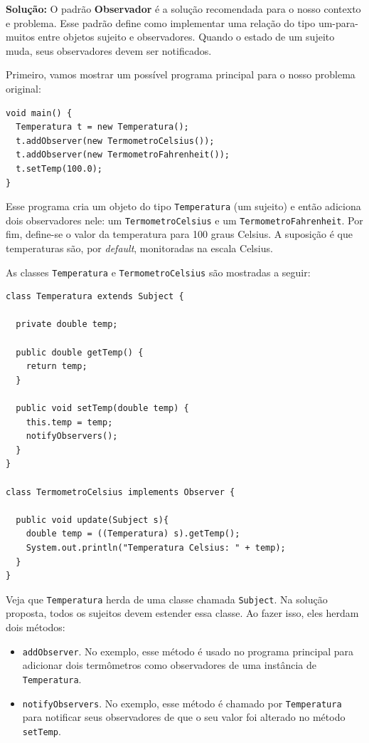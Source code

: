 \documentclass[
  11pt,
  twoside]{book}
\newcommand{\passthrough}[1]{#1}
\begin{document}
\textbf{Solução:} O padrão \textbf{Observador} é a solução recomendada
para o nosso contexto e problema. Esse padrão define como implementar
uma relação do tipo um-para-muitos entre objetos sujeito e observadores.
Quando o estado de um sujeito muda, seus observadores devem ser
notificados.

Primeiro, vamos mostrar um possível programa principal para o nosso
problema original:

\begin{lstlisting}
void main() {
  Temperatura t = new Temperatura();
  t.addObserver(new TermometroCelsius());
  t.addObserver(new TermometroFahrenheit());
  t.setTemp(100.0);
}
\end{lstlisting}

Esse programa cria um objeto do tipo
\passthrough{\lstinline!Temperatura!} (um sujeito) e então adiciona dois
observadores nele: um \passthrough{\lstinline!TermometroCelsius!} e um
\passthrough{\lstinline!TermometroFahrenheit!}. Por fim, define-se o
valor da temperatura para 100 graus Celsius. A suposição é que
temperaturas são, por \emph{default}, monitoradas na escala Celsius.

As classes \passthrough{\lstinline!Temperatura!} e
\passthrough{\lstinline!TermometroCelsius!} são mostradas a seguir:

\begin{lstlisting}
class Temperatura extends Subject {

  private double temp;

  public double getTemp() {
    return temp;
  }

  public void setTemp(double temp) {
    this.temp = temp;
    notifyObservers();
  }
}

class TermometroCelsius implements Observer {

  public void update(Subject s){
    double temp = ((Temperatura) s).getTemp();
    System.out.println("Temperatura Celsius: " + temp);
  }
}
\end{lstlisting}

Veja que \passthrough{\lstinline!Temperatura!} herda de uma classe
chamada \passthrough{\lstinline!Subject!}. Na solução proposta, todos os
sujeitos devem estender essa classe. Ao fazer isso, eles herdam dois
métodos:

\begin{itemize}
\item
  \passthrough{\lstinline!addObserver!}. No exemplo, esse método é usado
  no programa principal para adicionar dois termômetros como
  observadores de uma instância de
  \passthrough{\lstinline!Temperatura!}.
\item
  \passthrough{\lstinline!notifyObservers!}. No exemplo, esse método é
  chamado por \passthrough{\lstinline!Temperatura!} para notificar seus
  observadores de que o seu valor foi alterado no método
  \passthrough{\lstinline!setTemp!}.
\end{itemize}
\end{document}
